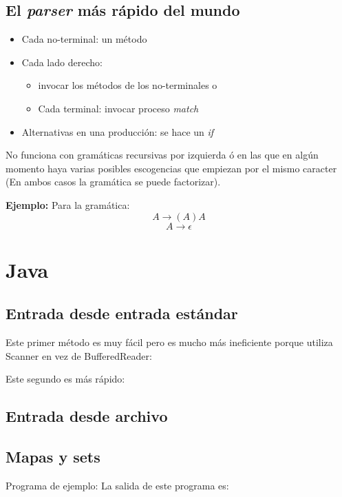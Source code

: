 \documentclass[10pt,letterpaper]{article}
\begin{document}
\subsection{El \textit{parser} más rápido del mundo}
\begin{itemize}
\item Cada no-terminal: un método
\item Cada lado derecho: 
\begin{itemize}
\item invocar los métodos de los no-terminales o
\item Cada terminal: invocar proceso \textit{match}
\end{itemize}
\item Alternativas en una producción: se hace un \textit{if}
\end{itemize}
\medskip
No funciona con gramáticas recursivas por izquierda ó en las que en algún momento haya
varias posibles escogencias que empiezan por el mismo caracter (En ambos casos la gramática se puede factorizar).

\medskip
\textbf{Ejemplo:} Para la gramática:
$$
A \longrightarrow (A)A 
$$ $$
A \longrightarrow \epsilon
$$



\section{Java}
\subsection{Entrada desde entrada estándar}
Este primer método es muy fácil pero es mucho más ineficiente porque utiliza Scanner en vez de BufferedReader: \\

\bigskip

Este segundo es más rápido: \\
\subsection{Entrada desde archivo}

\subsection{Mapas y sets}
Programa de ejemplo:
\bigskip
La salida de este programa es: \\
\end{document}
